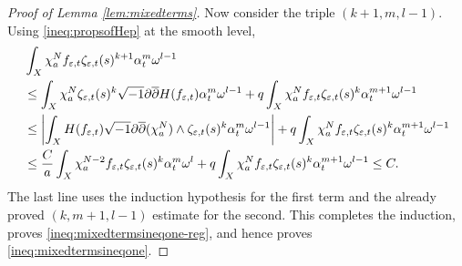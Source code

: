 \documentclass[10pt,a4paper]{amsart}
\renewcommand{\d}{\partial}
\newcommand{\ddbar}{\sqrt{-1}\d\overline{\d}}
\newcommand{\vep}{\varepsilon}
\begin{document}
\begin{proof}[Proof of Lemma \ref{lem:mixedterms}]
Now consider the triple $(k+1,m,l-1)$.  Using \eqref{ineq:propsofHep} at the smooth level,
\begin{align}
&\int_X\chi_a^N f_{\vep,t}\zeta_{\vep,t}(s)^{k+1}\alpha_t^m\omega^{l-1}      \notag\\
&\leq
\int_X\chi_a^N\zeta_{\vep,t}(s)^k\ddbar H(f_{\vep,t})\alpha_t^m\omega^{l-1}
+q\int_X\chi_a^N f_{\vep,t}\zeta_{\vep,t}(s)^k\alpha_t^{m+1}\omega^{l-1}      \notag\\
&\leq\left|\int_X H(f_{\vep,t})\ddbar(\chi_a^N)\wedge\zeta_{\vep,t}(s)^k\alpha_t^m\omega^{l-1}\right|
+q\int_X\chi_a^N f_{\vep,t}\zeta_{\vep,t}(s)^k\alpha_t^{m+1}\omega^{l-1}      \notag\\
&\leq
\frac{C}{a}\int_X\chi_a^{N-2}f_{\vep,t}\zeta_{\vep,t}(s)^k\alpha_t^m\omega^l
+q\int_X\chi_a^N f_{\vep,t}\zeta_{\vep,t}(s)^k\alpha_t^{m+1}\omega^{l-1}
\leq C.\label{ineq:regularized-kplusone}
\end{align}
The last line uses the induction hypothesis for the first term and the already proved $(k,m+1,l-1)$ estimate for the second.  This completes the induction, proves \eqref{ineq:mixedtermsineqone-reg}, and hence proves \eqref{ineq:mixedtermsineqone}.
\end{proof}
\end{document}
